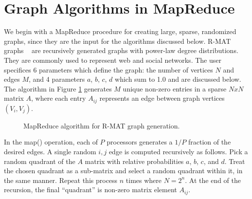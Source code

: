 \section{Graph Algorithms in MapReduce}
\label{sec:graph}

We begin with a MapReduce procedure for creating large, sparse,
randomized graphs, since they are the input for the algorithms
discussed below.  R-MAT graphs ~\cite{RMAT} are recursively generated
graphs with power-law degree distributions.  They are commonly used to
represent web and social networks.  The user specifices 6 parameters
which define the graph: the number of vertices $N$ and edges $M$, and
4 parameters $a$, $b$, $c$, $d$ which sum to 1.0 and are discussed
below.  The algorithm in Figure \ref{fig:rmat} generates $M$ unique
non-zero entries in a sparse $NxN$ matrix $A$, where each entry
$A_{ij}$ represents an edge between graph vertices $(V_i,V_j)$.

\begin{figure}[htb]
 \begin{center}\end{center}

 \caption{MapReduce algorithm for R-MAT graph generation.}

 \label{fig:rmat}
\end{figure}

In the map() operation, each of $P$ processors generates a $1/P$
fraction of the desired edges.  A single random $i,j$ edge is computed
recursively as follows.  Pick a random quadrant of the $A$ matrix with
relative probabilities $a$, $b$, $c$, and $d$.  Treat the chosen
quadrant as a sub-matrix and select a random quadrant within it, in
the same manner.  Repeat this process $n$ times where $N = 2^n$.  At
the end of the recursion, the final ``quadrant'' is non-zero matrix
element $A_{ij}$.

